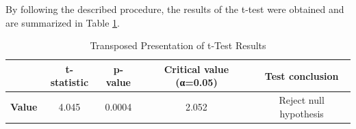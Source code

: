 \documentclass{mcmthesis}
\begin{document}
	By following the described procedure, the results of the t-test were obtained and are summarized in Table \ref{1}.


\begin{table}[H]
	\centering
	\caption{Transposed Presentation of t-Test Results}
	\label{table:H_t-test_result_transposed}
	\begin{tabular}{lcccc}
		\toprule
		\rowcolor{red!10}
		& \textbf{t-statistic} & \textbf{p-value} & \textbf{Critical value (α=0.05)} & \textbf{Test conclusion} \\
		\midrule
		\rowcolor{white} %
		\textbf{Value} & 4.045 & 0.0004 & 2.052 & Reject null hypothesis \\
		\bottomrule
	\end{tabular}
	\label{1}
\end{table}
	
\end{document}
